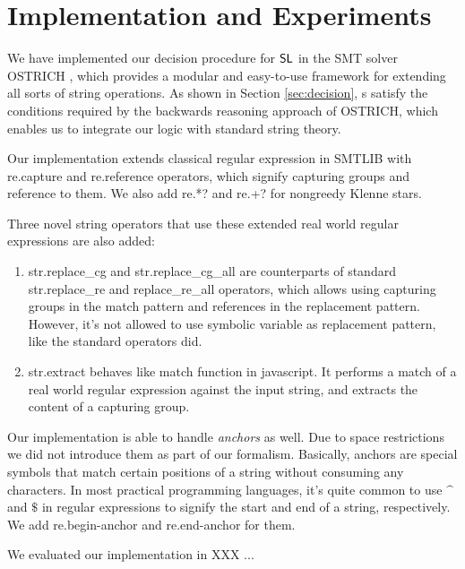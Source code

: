\section{Implementation and Experiments}
\label{sect:impl}

We have implemented our decision procedure for $\mathsf{SL}$ in the SMT solver OSTRICH \cite{CHL+19}, which provides a modular and easy-to-use framework for extending all sorts of string operations. As shown in Section \ref{sec:decision}, \PSST s satisfy the conditions required by the backwards reasoning approach of OSTRICH, which enables us to integrate our logic with standard string theory.

Our implementation extends classical regular expression in SMTLIB with {\sf re.capture} and {\sf re.reference} operators, which signify capturing groups and reference to them. We also add {\sf re.*?} and {\sf re.+?} for nongreedy Klenne stars.

Three novel string operators that use these extended real world regular expressions are also added:

\begin{enumerate}
  \item {\sf str.replace\_cg} and {\sf str.replace\_cg\_all} are
  counterparts of standard {\sf str.replace\_re} and
  {\sf replace\_re\_all} operators, which allows using
  capturing groups in the match pattern and references
  in the replacement pattern. However, it's not allowed to use symbolic
  variable as replacement pattern, like the standard operators did.
  
  \item {\sf str.extract} behaves like {\sf match} function in
  javascript. It performs a match of a real world regular expression against
  the input string, and extracts the content of a capturing group.
\end{enumerate}

Our implementation is able to handle \textit{anchors} as well. Due to space restrictions we did not introduce them as part of our formalism. Basically, anchors are special symbols that match certain positions of a string without consuming any characters. In most practical programming languages, it's quite common to use $\^{}$ and $\$$ in regular expressions to signify the start and end of a string, respectively. We add \textsf{re.begin-anchor} and \textsf{re.end-anchor} for them.

We evaluated our implementation in XXX ...

